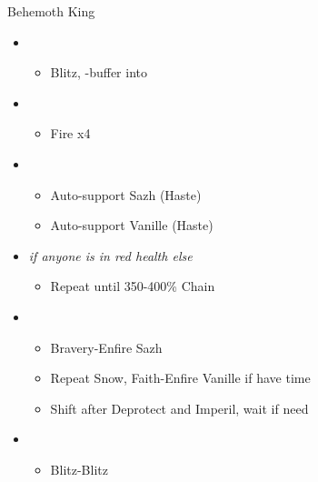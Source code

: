 \begin{battle}[0:55]{Behemoth King}
	\begin{itemize}
		\item \second
		      \begin{itemize}
			      \item Blitz, \rav-buffer into
		      \end{itemize}
		\item \sixth
		      \begin{itemize}
			      \item Fire x4
		      \end{itemize}
		\item \fourth
		      \begin{itemize}
			      \item Auto-support Sazh (Haste)
			      \item Auto-support Vanille (Haste)
		      \end{itemize}
		\item \fifth \textit{if anyone is in red health else} \sixth
		      \begin{itemize}
			      \item Repeat until 350-400\% Chain
		      \end{itemize}
		\item \third
		      \begin{itemize}
			      \item Bravery-Enfire Sazh
			      \item Repeat Snow, Faith-Enfire Vanille if have time
			      \item Shift after Deprotect and Imperil, wait if need
		      \end{itemize}
		\item \second
		      \begin{itemize}
			      \item Blitz-Blitz
		      \end{itemize}
	\end{itemize}
\end{battle}

